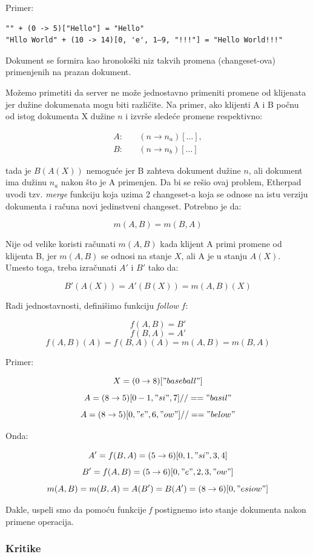 \documentclass[12pt]{article}
\begin{document}
Primer:

\begin{verbatim}
"" + (0 -> 5)["Hello"] = "Hello"
"Hllo World" + (10 -> 14)[0, 'e', 1–9, "!!!"] = "Hello World!!!"
\end{verbatim}

Dokument se formira kao hronološki niz takvih promena (changeset-ova) primenjenih na prazan dokument.

Možemo primetiti da server ne može jednostavno primeniti promene od klijenata jer dužine dokumenata mogu biti različite. Na primer, ako klijenti A i B počnu od istog dokumenta X dužine $n$ i izvrše sledeće promene respektivno:

\begin{align*}
A: & \quad (n \to n_a)[\dots], \\
B: & \quad (n \to n_b)[\dots]
\end{align*}

tada je $B(A(X))$ nemoguće jer B zahteva dokument dužine $n$, ali dokument ima dužinu $n_a$ nakon što je A primenjen. Da bi se rešio ovaj problem, Etherpad uvodi tzv. \emph{merge} funkciju koja uzima 2 changeset-a koja se odnose na istu verziju dokumenta i računa novi jedinstveni changeset. Potrebno je da:

\[ m(A,B) = m(B,A) \]

Nije od velike koristi računati $m(A, B)$ kada klijent A primi promene od klijenta B, jer $m(A, B)$ se odnosi na stanje $X$, ali A je u stanju $A(X)$. Umesto toga, treba izračunati $A'$ i $B'$ tako da:

\[ B'(A(X)) = A'(B(X)) = m(A,B)(X) \]

Radi jednostavnosti, definišimo funkciju \emph{follow} $f$:

\[ f(A,B) = B' \]
\[ f(B,A) = A' \]
\[ f(A,B)(A) = f(B,A)(A) = m(A,B) = m(B,A) \]

Primer:

\[ X = (0 \to 8)["baseball"] \]
\[ A = (8 \to 5)[0-1,"si",7] // == "basil"\]
\[ A = (8 \to 5)[0,"e",6,"ow"] // == "below"\]

Onda:

\[ A' = f(B,A) = (5 \to 6)[0,1,"si",3,4] \]
\[ B' = f(A,B) = (5 \to 6)[0,"e",2,3,"ow"]\]
\[ m(A,B) = m(B,A) = A(B') = B(A') = (8 \to 6)[0, "esiow"]\]

Dakle, uspeli smo da pomoću funkcije \textit{f} postignemo isto stanje dokumenta nakon primene operacija.

\subsubsection{Kritike}
\end{document}
